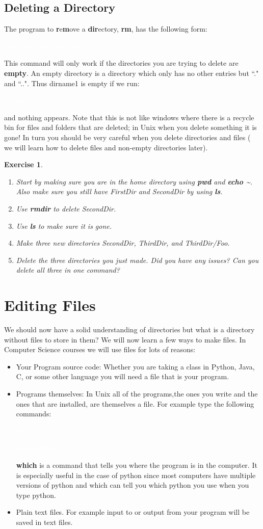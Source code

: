 \documentclass{book}
\newcommand{\commandline}[1]{\begin{center} \colorbox{Dark}{\textcolor{white}{#1}} \end{center}}
\newtheorem{ex}{Exercise}[chapter]
\begin{document}
\subsection{Deleting a Directory}
The program to \textbf{r}e\textbf{m}ove a \textbf{dir}ectory, \textbf{rm}, has the following form:
\commandline{rmdir dirname1 dirname2 ...}
This command will only work if the directories you are trying to delete are \textbf{empty}. An empty directory is a directory which only has no other entries but ``." and ``..". Thus dirname1 is empty if we run:
\commandline{ls dirname1}
and nothing appears. Note that this is not like windows where there is a recycle bin for files and folders that are deleted; in Unix when you delete something it is gone! In turn you should be very careful when you delete directories and files ( we will learn how to delete files and non-empty directories later).
\begin{ex}
	\begin{enumerate}
		\item Start by making sure you are in the home directory using \textbf{pwd} and \textbf{echo \~{}}. Also make sure you still have FirstDir and SecondDir by using \textbf{ls}.
		\item Use \textbf{rmdir} to delete SecondDir.
		\item Use \textbf{ls} to make sure it is gone.
		\item Make three new directories SecondDir, ThirdDir, and ThirdDir/Foo.
		\item Delete the three directories you just made. Did you have any issues? Can you delete all three in one command?
	\end{enumerate}
\end{ex}


\section{Editing Files}
We should now have a solid understanding of directories but what is a directory without files to store in them? We will now learn a few ways to make files. In Computer Science courses we will use files for lots of reasons:
\begin{itemize}
	\item Your Program source code: Whether you are taking a class in Python, Java, C, or some other language you will need a file that is your program.
	\item Programs themselves: In Unix all of the programs,the ones you write and the ones that are installed, are themselves a file. For example type the following commands:
		\commandline{which ls}
		\commandline{which python}
	\textbf{which} is a command that tells you where the program is in the computer. It is especially useful in the case of python since most computers have multiple versions of python and which can tell you which python you use when you type python.
	\item Plain text files. For example input to or output from your program will be saved in text files. 
\end{itemize}
\end{document}
